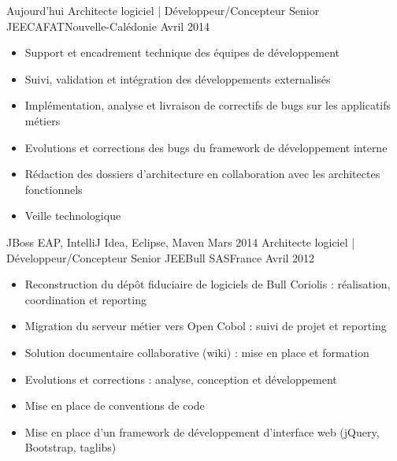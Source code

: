 \begin{experiences}
  \entry
    {Aujourd'hui}   {Architecte logiciel | Développeur/Concepteur Senior JEE}{CAFAT}{Nouvelle-Calédonie}
    {Avril 2014}    {
                      \begin{itemize}
                        \item Support et encadrement technique des équipes de développement                           
                        \item Suivi, validation et intégration des développements externalisés                        
                        \item Implémentation, analyse et livraison de correctifs de bugs sur les applicatifs métiers  
                        \item Evolutions et corrections des bugs du framework de développement interne                
                        \item Rédaction des dossiers d'architecture en collaboration avec les architectes fonctionnels
                        \item Veille technologique                                                                    
                      \end{itemize}
                    }
                    {JBoss EAP, IntelliJ Idea, Eclipse, Maven}
  \expitemsep
  \entry
    {Mars 2014}     {Architecte logiciel | Développeur/Concepteur Senior JEE}{Bull SAS}{France}
    {Avril 2012}    {
                      \begin{itemize}
                        \item Reconstruction du dépôt fiduciaire de logiciels de Bull Coriolis : réalisation, coordination et reporting
                        \item Migration du serveur métier vers Open Cobol : suivi de projet et reporting                
                        \item Solution documentaire collaborative (wiki) : mise en place et formation                   
                        \item Evolutions et corrections : analyse, conception et développement                          
                        \item Mise en place de conventions de code                                                      
                        \item Mise en place d'un framework de développement d'interface web (jQuery, Bootstrap, taglibs)

\end{itemize}}
\end{experiences}
